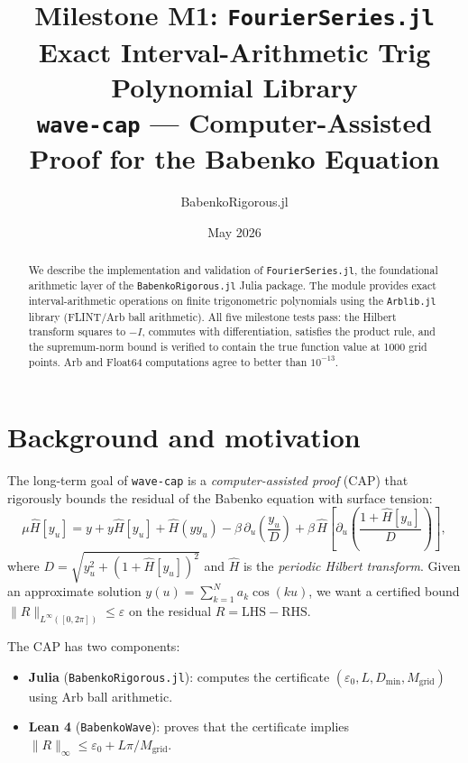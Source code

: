 \documentclass[11pt]{article}
\title{\textbf{Milestone M1: \texttt{FourierSeries.jl}}\\[0.4em]
\large Exact Interval-Arithmetic Trig Polynomial Library\\[0.2em]
\normalsize \texttt{wave-cap} --- Computer-Assisted Proof for the Babenko Equation}
\author{BabenkoRigorous.jl}
\date{May 2026}
\theoremstyle{definition}
\begin{document}
\maketitle

\begin{abstract}
We describe the implementation and validation of \texttt{FourierSeries.jl}, the
foundational arithmetic layer of the \texttt{BabenkoRigorous.jl} Julia package.
The module provides exact interval-arithmetic operations on finite trigonometric
polynomials using the \texttt{Arblib.jl} library (FLINT/Arb ball arithmetic).
All five milestone tests pass: the Hilbert transform squares to $-I$, commutes
with differentiation, satisfies the product rule, and the supremum-norm bound
is verified to contain the true function value at 1000 grid points. Arb and
Float64 computations agree to better than $10^{-13}$.
\end{abstract}

\tableofcontents
\bigskip

\section{Background and motivation}

The long-term goal of \texttt{wave-cap} is a \emph{computer-assisted proof} (CAP)
that rigorously bounds the residual of the Babenko equation with surface tension:
\begin{equation}\label{eq:babenko}
  \mu \hat H[y_u]
  = y + y\hat H[y_u] + \hat H(y y_u)
    - \beta\,\partial_u\!\left(\frac{y_u}{D}\right)
    + \beta\,\hat H\!\left[\partial_u\!\left(\frac{1+\hat H[y_u]}{D}\right)\right],
\end{equation}
where $D = \sqrt{y_u^2 + (1+\hat H[y_u])^2}$ and $\hat H$ is the
\emph{periodic Hilbert transform}.
Given an approximate solution $y(u) = \sum_{k=1}^N a_k \cos(ku)$, we want a
certified bound $\|R\|_{L^\infty([0,2\pi])} \le \varepsilon$ on the residual
$R = \mathrm{LHS} - \mathrm{RHS}$.

The CAP has two components:
\begin{itemize}
  \item \textbf{Julia} (\texttt{BabenkoRigorous.jl}): computes the certificate
        $(\varepsilon_0, L, D_{\min}, M_{\mathrm{grid}})$ using Arb ball arithmetic.
  \item \textbf{Lean 4} (\texttt{BabenkoWave}): proves that the certificate implies
        $\|R\|_\infty \le \varepsilon_0 + L\pi/M_{\mathrm{grid}}$.
\end{itemize}
\end{document}
